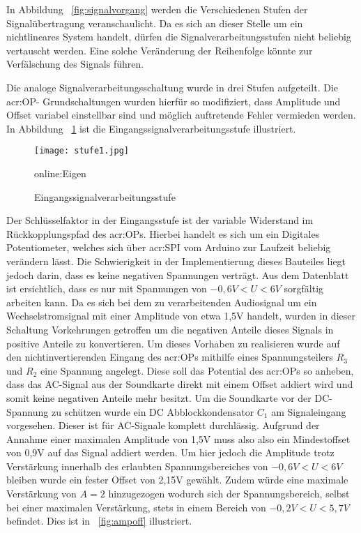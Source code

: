 In Abbildung ~\ref{fig:signalvorgang} werden die Verschiedenen Stufen der Signalübertragung veranschaulicht. Da es sich an dieser Stelle um ein nichtlineares System handelt, dürfen die Signalverarbeitungsstufen nicht beliebig vertauscht werden. Eine solche Veränderung der Reihenfolge könnte zur Verfälschung des Signals führen. 

Die analoge Signalverarbeitungsschaltung wurde in drei Stufen aufgeteilt. Die \gls{acr:OP}- Grundschaltungen wurden hierfür so modifiziert, dass Amplitude und Offset variabel einstellbar sind und möglich auftretende Fehler vermieden werden. In Abbildung ~\ref{fig:stufe1} ist die Eingangssignalverarbeitungsstufe illustriert. 

\begin{figure}[H]
	\centering
	\texttt{[image: stufe1.jpg]}
	\caption[Eingangssignalverarbeitungsstufe]{Eingangssignalverarbeitungsstufe} \gls{online:Eigen}
	\label{fig:stufe1}
\end{figure}

Der Schlüsselfaktor in der Eingangsstufe ist der variable Widerstand im Rückkopplungspfad des \gls{acr:OP}s. Hierbei handelt es sich um ein Digitales Potentiometer, welches sich über \gls{acr:SPI} vom Arduino zur Laufzeit beliebig verändern lässt. Die Schwierigkeit in der Implementierung dieses Bauteiles liegt jedoch darin, dass es keine negativen Spannungen verträgt. Aus dem Datenblatt ist ersichtlich, dass es nur mit Spannungen von $-0,6V<U<6V$ sorgfältig arbeiten kann. Da es sich bei dem zu verarbeitenden Audiosignal um ein Wechselstromsignal mit einer Amplitude von etwa 1,5V handelt, wurden in dieser Schaltung Vorkehrungen getroffen um die negativen Anteile dieses Signals in positive Anteile zu konvertieren. Um dieses Vorhaben zu realisieren wurde auf den nichtinvertierenden Eingang des \gls{acr:OP}s mithilfe eines Spannungsteilers $R_{3}$ und $R_{2}$ eine Spannung angelegt. Diese soll das Potential des \gls{acr:OP}s so anheben, dass das AC-Signal aus der Soundkarte direkt mit einem Offset addiert wird und somit keine negativen Anteile mehr besitzt. Um die Soundkarte vor der DC-Spannung zu schützen wurde ein DC Abblockkondensator $C_{1}$ am Signaleingang vorgesehen. Dieser ist für AC-Signale komplett durchlässig. Aufgrund der Annahme einer maximalen Amplitude von 1,5V muss also also ein Mindestoffset von 0,9V auf das Signal addiert werden. Um hier jedoch die Amplitude trotz Verstärkung innerhalb des erlaubten Spannungsbereiches von $-0,6V<U<6V$ bleiben wurde ein fester Offset von 2,15V gewählt. Zudem würde eine maximale Verstärkung von $A=2$ hinzugezogen wodurch sich der Spannungsbereich, selbst bei einer maximalen Verstärkung, stets in einem Bereich von $-0,2V<U<5,7V$ befindet. Dies ist in ~\ref{fig:ampoff} illustriert. 

